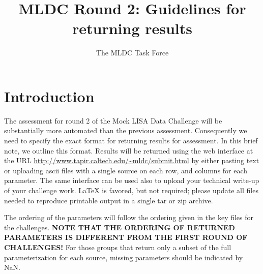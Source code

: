 \documentclass[11pt]{article}
\title{MLDC Round 2: Guidelines for returning results}
\author{The MLDC Task Force}
\begin{document}
\maketitle
\section{Introduction}
The assessment for round 2 of the Mock LISA Data Challenge will be substantially more automated than the previous assessment. Consequently we need to specify the exact format for returning results for assessment. In this brief note, we outline this format. Results will be returned using the web interface at the URL \url{http://www.tapir.caltech.edu/~mldc/submit.html}
by either pasting text or uploading ascii files with a single source on each row, and columns for each parameter. The same interface can be used also to upload your technical write-up of your challenge work. LaTeX is favored, but not required; please update all files needed to reproduce printable output in a single tar or zip archive.

The ordering of the parameters will follow the ordering given in the key files for the challenges. {\bf NOTE THAT THE ORDERING OF RETURNED PARAMETERS IS DIFFERENT FROM THE FIRST ROUND OF CHALLENGES!} For those groups that return only a subset of the full parameterization for each source, missing parameters should be indicated by NaN. 
\end{document}
